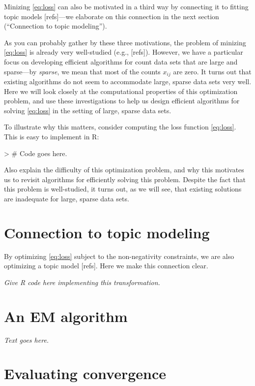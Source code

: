 \documentclass[final]{siamart171218}
\begin{document}
Minizing \eqref{eq:loss} can also be motivated in a third way by
connecting it to fitting topic models [refs]---we elaborate on this
connection in the next section (``Connection to topic modeling'').

As you can probably gather by these three motivations, the problem of
minizing \eqref{eq:loss} is already very well-studied (e.g.,
[refs]). However, we have a particular focus on developing efficient
algorithms for count data sets that are large and sparse---by {\em
  sparse}, we mean that most of the counts $x_{ij}$ are zero. It
turns out that existing algorithms do not seem to accommodate large,
sparse data sets very well. Here we will look closely at the
computational properties of this optimization problem, and use these
investigations to help us design efficient algorithms for solving
\eqref{eq:loss} in the setting of large, sparse data sets.

To illustrate why this matters, consider computing the loss function
\eqref{eq:loss}. This is easy to implement in R:
\begin{Schunk}
\begin{Sinput}
> # Code goes here.
\end{Sinput}
\end{Schunk}

Also explain the difficulty of this optimization problem, and why this
motivates us to revisit algorithms for efficiently solving this
problem.  Despite the fact that this problem is well-studied, it turns
out, as we will see, that existing solutions are inadequate for large,
sparse data sets.



\section{Connection to topic modeling}

By optimizing \eqref{eq:loss} subject to the non-negativity
constraints, we are also optimizing a topic model [refs]. Here we make
this connection clear.

{\em Give R code here implementing this transformation.}

\section{An EM algorithm}

{\em Text goes here.}

\section{Evaluating convergence}
\end{document}
